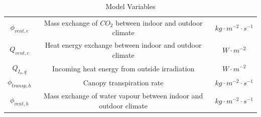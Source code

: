\begin{table}[H]
\begin{tabular}{|c|c|c|}
		 $\phi_{vent,c}$ & Mass exchange of $CO_2$ between indoor and outdoor climate & $kg \cdot m^{-2} \cdot s^{-1}$ \\ 
		 $Q_{vent,c}$ & Heat energy exchange between indoor and outdoor climate & $W \cdot m^{-2}$ \\ 
		 $Q_{I_o,q}$ & Incoming heat energy from outside irradiation & $W \cdot m^{-2}$ \\ 
		 $\phi_{transp,h}$ & Canopy transpiration rate & $kg \cdot m^{-2} \cdot s^{-1}$ \\ 
		 $\phi_{vent,h}$ & Mass exchange of water vapour between indoor and outdoor climate & $kg \cdot m^{-2} \cdot s^{-1}$ \\ \hline
	\end{tabular}
	\caption{Model Variables}
	\label{tab:model_variables_and_descriptions}
\end{table}


